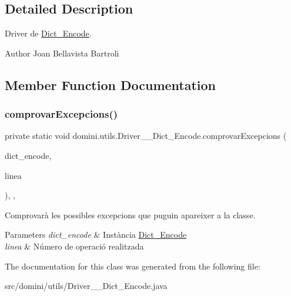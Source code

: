 \subsection{Detailed Description}
Driver de \hyperlink{classdomini_1_1utils_1_1Dict__Encode}{Dict\+\_\+\+Encode}. 

\begin{DoxyAuthor}{Author}
Joan Bellavista Bartroli 
\end{DoxyAuthor}


\subsection{Member Function Documentation}
\mbox{\label{classdomini_1_1utils_1_1Driver____Dict__Encode_ab67e87f26a75c12e50130a5e5facb52e}} 
\subsubsection{\texorpdfstring{comprovar\+Excepcions()}{comprovarExcepcions()}}
{\footnotesize\ttfamily private static void domini.\+utils.\+Driver\+\_\+\+\_\+\+Dict\+\_\+\+Encode.\+comprovar\+Excepcions (\begin{DoxyParamCaption}\item[{\hyperlink{classdomini_1_1utils_1_1Dict__Encode}{Dict\+\_\+\+Encode}}]{dict\+\_\+encode,  }\item[{String}]{linea }\end{DoxyParamCaption})\hspace{0.3cm}{\ttfamily [inline]}, {\ttfamily [static]}, {\ttfamily [private]}}



Comprovarà les possibles excepcions que puguin apareixer a la classe. 


\begin{DoxyParams}{Parameters}
{\em dict\+\_\+encode} & Instància \hyperlink{classdomini_1_1utils_1_1Dict__Encode}{Dict\+\_\+\+Encode} \\
\hline
{\em linea} & Número de operació realitzada \\
\hline
\end{DoxyParams}


The documentation for this class was generated from the following file\+:\begin{DoxyCompactItemize}
\item 
src/domini/utils/Driver\+\_\+\+\_\+\+Dict\+\_\+\+Encode.\+java\end{DoxyCompactItemize}
